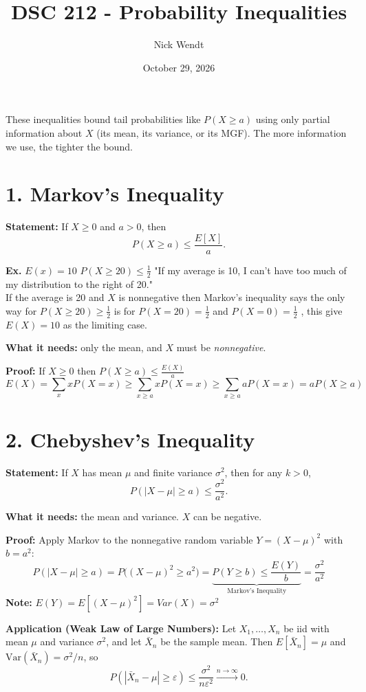 \documentclass{article}
\title{\large DSC 212 - Probability Inequalities}
\author{Nick Wendt}
\date{October 29, 2026}
\begin{document}
\maketitle

These inequalities bound tail probabilities like $P(X \ge a)$ using only
partial information about $X$ (its mean, its variance, or its MGF). The more
information we use, the tighter the bound.

\section*{1. Markov's Inequality}

\textbf{Statement:} If $X \ge 0$ and $a > 0$, then
$$
P(X \ge a) \le \frac{E[X]}{a}.
$$


\textbf{Ex.} $E(x)=10$ $P(X\geq 20)\leq \frac12$ \quad "If my average is 10, I can't have too much of my distribution to the right of 20."\\
If the average is 20 and $X$ is nonnegative then Markov's inequality says the only way for $P(X\geq 20) \geq \frac12$ is for 
$P(X=20)=\frac12$ and $P(X=0)=\frac12$ , this give $E(X)=10$ as the limiting case. 
\bigskip

\textbf{What it needs:} only the mean, and $X$ must be \emph{nonnegative}.

\textbf{Proof:} If $X\geq 0$ then $P(X\geq a) \leq  \frac{E(X)}{a}$
$$
E(X)=\sum_x xP(X=x) \geq \sum_{x\geq a}xP(X=x) \geq \sum_{x\geq a}aP(X=x)=aP(X\geq a)
$$


\section*{2. Chebyshev's Inequality}

\textbf{Statement:} If $X$ has mean $\mu$ and finite variance $\sigma^2$, then
for any $k > 0$,
$$
P(|X - \mu| \ge a) \le \frac{\sigma^2}{a^2}.
$$

\textbf{What it needs:} the mean and variance. $X$ can be negative.

\textbf{Proof:} Apply Markov to the nonnegative random variable $Y=(X-\mu)^2$
with $b=a^2$:
$$
P(|X - \mu| \ge a) = P\big((X - \mu)^2 \ge a^2\big)=\underbrace{P(Y\geq b)\leq \frac{E(Y)}{b}}_{\text{Markov's Inequality}}=\frac{\sigma^2}{a^2}
$$
\textbf{Note:} $E(Y)=E[(X-\mu)^2]=Var(X)=\sigma^2$

\textbf{Application (Weak Law of Large Numbers):} Let $X_1, \dots, X_n$ be iid
with mean $\mu$ and variance $\sigma^2$, and let $\bar{X}_n$ be the sample
mean. Then $E[\bar{X}_n] = \mu$ and $\text{Var}(\bar{X}_n) = \sigma^2/n$, so
$$
P(|\bar{X}_n - \mu| \ge \varepsilon) \le \frac{\sigma^2}{n\varepsilon^2}
\xrightarrow{n \to \infty} 0.
$$
\end{document}
